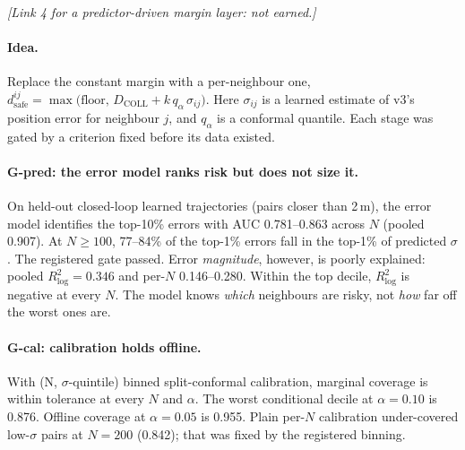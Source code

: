 \documentclass{article}
\newcommand{\dsafe}{d_{\mathrm{safe}}}
\begin{document}
\emph{[Link 4 for a predictor-driven margin layer: not earned.]}

\paragraph{Idea.} Replace the constant margin with a per-neighbour one,
$\dsafe^{ij} = \max\big(\text{floor},\,D_{\mathrm{COLL}} + k\,q_\alpha\,\sigma_{ij}\big)$. Here $\sigma_{ij}$ is
a learned estimate of v3's position error for neighbour $j$, and $q_\alpha$ is a conformal
quantile. Each stage was gated by a criterion fixed before its data existed.

\paragraph{G-pred: the error model ranks risk but does not size it.}
On held-out closed-loop learned trajectories (pairs closer than 2\,m), the error model identifies
the top-10\% errors with AUC 0.781--0.863 across $N$ (pooled 0.907). At $N\ge100$, 77--84\% of the
top-1\% errors fall in the top-1\% of predicted $\sigma$. The registered gate passed. Error
\emph{magnitude}, however, is poorly explained: pooled $R^2_{\log} = 0.346$ and per-$N$
0.146--0.280. Within the top decile, $R^2_{\log}$ is negative at every $N$. The model knows
\emph{which} neighbours are risky, not \emph{how} far off the worst ones are.

\paragraph{G-cal: calibration holds offline.}
With (N, $\sigma$-quintile) binned split-conformal calibration, marginal coverage is within
tolerance at every $N$ and $\alpha$. The worst conditional decile at $\alpha=0.10$ is 0.876.
Offline coverage at $\alpha=0.05$ is 0.955. Plain per-$N$ calibration under-covered low-$\sigma$
pairs at $N=200$ (0.842); that was fixed by the registered binning.
\end{document}
